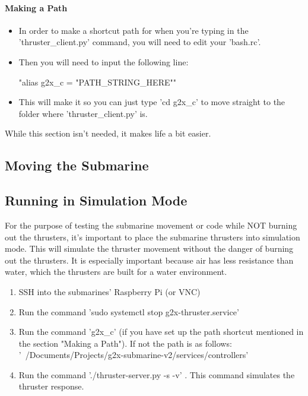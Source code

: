 \documentclass[
18pt, %
a4paper, %
oneside, %
headinclude,footinclude, %
]{scrartcl}
\begin{document}
\paragraph{Making a Path}
	\begin{itemize}
		\item In order to make a shortcut path for when you're typing in the 'thruster\_client.py' command, you will need to edit your 'bash.rc'.
		\item Then you will need to input the following line:
		
		"alias g2x\_c = "PATH\_STRING\_HERE""
		\item This will make it so you can just type 'cd g2x\_c' to move straight to the folder where 'thruster\_client.py' is.
	\end{itemize} 

 While this section isn't needed, it makes life a bit easier.

\subsection{Moving the Submarine}




\subsection{Running in Simulation Mode}
For the purpose of testing the submarine movement or code while NOT burning out the thrusters, it's important to place the submarine thrusters into simulation mode. This will simulate the thruster movement without the danger of burning out the thrusters. It is especially important because air has less resistance than water, which the thrusters are built for a water environment.

\begin{enumerate}
	\item SSH into the submarines' Raspberry Pi (or VNC)
	\item Run the command 'sudo systemctl stop g2x-thruster.service'
	\item Run the command 'g2x\_c' (if you have set up the path shortcut mentioned in the section "Making a Path"). If not the path is as follows: '~/Documents/Projects/g2x-submarine-v2/services/controllers'
	\item Run the command './thruster-server.py -s -v' . This command simulates the thruster response.
\end{enumerate}
\end{document}
